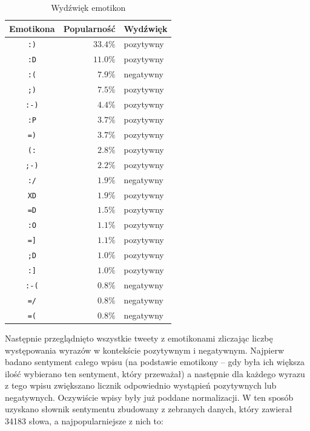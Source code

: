 \begin{table}[ht!]  
\begin{center}  
\begin{tabular}{|c|r|l|}
\hline
Emotikona & Popularność & Wydźwięk
\\ \hline
\texttt{:)} & $33.4\%$ & pozytywny \\ \hline
\texttt{:D} & $11.0\%$ & pozytywny \\ \hline
\texttt{:(} & $7.9\%$ & negatywny \\ \hline
\texttt{;)} & $7.5\%$ & pozytywny \\ \hline
\texttt{:-)} & $4.4\%$ & pozytywny \\ \hline
\texttt{:P} & $3.7\%$ & pozytywny \\ \hline
\texttt{=)} & $3.7\%$ & pozytywny \\ \hline
\texttt{(:} & $2.8\%$ & pozytywny \\ \hline
\texttt{;-)} & $2.2\%$ & pozytywny \\ \hline
\texttt{:/} & $1.9\%$ & negatywny \\ \hline
\texttt{XD} & $1.9\%$ & pozytywny \\ \hline
\texttt{=D} & $1.5\%$ & pozytywny \\ \hline
\texttt{:O} & $1.1\%$ & pozytywny \\ \hline
\texttt{=]} & $1.1\%$ & pozytywny \\ \hline
\texttt{;D} & $1.0\%$ & pozytywny \\ \hline
\texttt{:]} & $1.0\%$ & pozytywny \\ \hline
\texttt{:-(} & $0.8\%$ & negatywny \\ \hline
\texttt{=/} & $0.8\%$ & negatywny \\ \hline
\texttt{=(} & $0.8\%$ & negatywny \\ \hline
\end{tabular} 
\end{center} 
\caption{Wydźwięk emotikon}
\label{tab:wydzwiek-emotikon}
\end{table}

Następnie przeglądnięto wszystkie tweety z emotikonami zliczając liczbę
występowania wyrazów w kontekście pozytywnym i negatywnym.
Najpierw badano sentyment całego wpisu (na podstawie emotikony -- gdy była ich
większa ilość wybierano ten sentyment, który przeważał) a następnie dla każdego
wyrazu z tego wpisu zwiększano licznik odpowiednio wystąpień pozytywnych lub
negatywnych. Oczywiście wpisy były już poddane normalizacji.
W ten sposób uzyskano słownik sentymentu zbudowany z zebranych danych, który
zawierał 34183 słowa, a najpopularniejsze z nich to:


